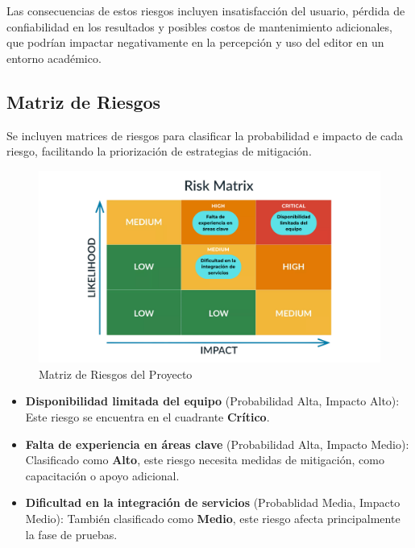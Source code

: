 \documentclass[stu, 12pt, letterpaper, donotrepeattitle, floatsintext, natbib]{apa7}
\begin{document}
\noindent Las consecuencias de estos riesgos incluyen insatisfacción del usuario, pérdida de confiabilidad en los resultados y posibles costos de mantenimiento adicionales, que podrían impactar negativamente en la percepción y uso del editor en un entorno académico.

\subsection{Matriz de Riesgos}

\noindent Se incluyen matrices de riesgos para clasificar la probabilidad e impacto de cada riesgo, facilitando la priorización de estrategias de mitigación.

\begin{figure}[!ht]
    \centering
    \caption{Matriz de Riesgos del Proyecto}
    \label{fig:project_risk_matrix}
    \includegraphics[width=\textwidth]{../imgs/proyecto.png}
\end{figure}

\begin{itemize}
    \item \textbf{Disponibilidad limitada del equipo} (Probabilidad Alta, Impacto Alto): Este riesgo se encuentra en el cuadrante \textbf{Crítico}.
    \item \textbf{Falta de experiencia en áreas clave} (Probabilidad Alta, Impacto Medio): Clasificado como \textbf{Alto}, este riesgo necesita medidas de mitigación, como capacitación o apoyo adicional.
    \item \textbf{Dificultad en la integración de servicios} (Probablidad Media, Impacto Medio): También clasificado como \textbf{Medio}, este riesgo afecta principalmente la fase de pruebas.
\end{itemize}
\end{document}
